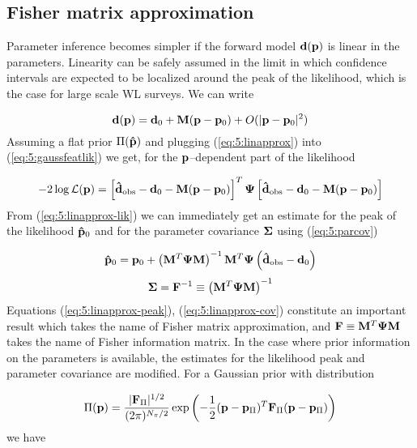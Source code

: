 \subsection{Fisher matrix approximation}
Parameter inference becomes simpler if the forward model $\mathbf{d}(\mathbf{p})$ is linear in the parameters. Linearity can be safely assumed in the limit in which confidence intervals are expected to be localized around the peak of the likelihood, which is the case for large scale WL surveys. We can write 

\begin{equation}
\label{eq:5:linapprox}
\mathbf{d}(\mathbf{p}) = \mathbf{d}_0 + \mathbf{M}(\mathbf{p}-\mathbf{p}_0) + O(\vert\mathbf{p}-\mathbf{p}_0\vert^2)
\end{equation}          
%
Assuming a flat prior $\Pi(\mathbf{\hat{p}})$ and plugging (\ref{eq:5:linapprox}) into (\ref{eq:5:gaussfeatlik}) we get, for the $\mathbf{p}$--dependent part of the likelihood

\begin{equation}
\label{eq:5:linapprox-lik}
-2\log\mathcal{L}(\mathbf{p}) = \left[\mathbf{\hat{d}}_{\rm obs}-\mathbf{d}_0-\mathbf{M}(\mathbf{p}-\mathbf{p}_0)\right]^T\mathbf{\Psi}\left[\mathbf{\hat{d}}_{\rm obs}-\mathbf{d}_0-\mathbf{M}(\mathbf{p}-\mathbf{p}_0)\right]
\end{equation}
%
From (\ref{eq:5:linapprox-lik}) we can immediately get an estimate for the peak of the likelihood $\mathbf{\hat{p}}_0$ and for the parameter covariance $\mathbf{\Sigma}$ using (\ref{eq:5:parcov})

\begin{equation}
\label{eq:5:linapprox-peak}
\mathbf{\hat{p}}_0 = \mathbf{p}_0 + \left(\mathbf{M}^T\mathbf{\Psi}\mathbf{M}\right)^{-1}\mathbf{M}^T\mathbf{\Psi}\left(\mathbf{\hat{d}}_{\rm obs}-\mathbf{d}_0\right)
\end{equation}
%
\begin{equation}
\label{eq:5:linapprox-cov}
\mathbf{\Sigma} = \mathbf{F}^{-1} \equiv \left(\mathbf{M}^T\mathbf{\Psi}\mathbf{M}\right)^{-1} 
\end{equation}
%
Equations (\ref{eq:5:linapprox-peak}), (\ref{eq:5:linapprox-cov}) constitute an important result which takes the name of Fisher matrix approximation, and $\mathbf{F}\equiv\mathbf{M}^T\mathbf{\Psi}\mathbf{M}$ takes the name of Fisher information matrix. In the case where prior information on the parameters is available, the estimates for the likelihood peak and parameter covariance are modified. For a Gaussian prior with distribution

\begin{equation}
\label{eq:5:gaussprior}
\Pi(\mathbf{p}) = \frac{\vert\mathbf{F}_\Pi\vert^{1/2}}{(2\pi)^{N_\pi/2}}\exp\left(-\frac{1}{2}(\mathbf{p}-\mathbf{p}_\Pi)^T\mathbf{F}_\Pi(\mathbf{p}-\mathbf{p}_\Pi)\right)
\end{equation}
%
we have 

